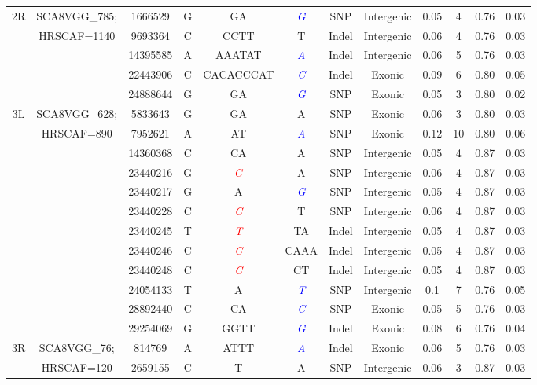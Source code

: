 \begin{table}[!b]
\begin{center}
\begin{tabular}{ccS[table-format=8.0]ccccccS[table-format=2.0]S[table-format=1.2]S[table-format=1.3]}
 \midrule
 2R & SCA8VGG\_785; & 1666529 & G & GA & \textcolor{blue}{\textit{G}} & SNP & Intergenic & 0.05 & 4 & 0.76 & 0.03\\
 & HRSCAF=1140 & 9693364 & C & CCTT & T & Indel & Intergenic & 0.06 & 4 & 0.76 & 0.03\\
 &  & 14395585 & A & AAATAT & \textcolor{blue}{\textit{A}} & Indel & Intergenic & 0.06 & 5 & 0.76 & 0.03\\
 &  & 22443906 & C & CACACCCAT & \textcolor{blue}{\textit{C}} & Indel & Exonic & 0.09 & 6 & 0.80 & 0.05\\
 &  & 24888644 & G & GA & \textcolor{blue}{\textit{G}} & SNP & Exonic & 0.05 & 3 & 0.80 & 0.02\\
 \midrule
3L & SCA8VGG\_628; & 5833643 & G & GA & A & SNP & Exonic & 0.06 & 3 & 0.80 & 0.03\\
 & HRSCAF=890 & 7952621 & A & AT & \textcolor{blue}{\textit{A}} & SNP & Exonic & 0.12 & 10 & 0.80 & 0.06\\
 &  & 14360368 & C & CA & A & SNP & Intergenic & 0.05 & 4 & 0.87 & 0.03\\
 &  & 23440216 & G & \textcolor{red}{\textit{G}} & A & SNP & Intergenic & 0.06 & 4 & 0.87 & 0.03\\
 &  & 23440217 & G & A & \textcolor{blue}{\textit{G}} & SNP & Intergenic & 0.05 & 4 & 0.87 & 0.03\\
 &  & 23440228 & C &\textcolor{red}{\textit{C}} & T & SNP & Intergenic & 0.06 & 4 & 0.87 & 0.03\\
 &  & 23440245 & T &\textcolor{red}{\textit{T}} & TA & Indel & Intergenic & 0.05 & 4 & 0.87 & 0.03\\
 &  & 23440246 & C &\textcolor{red}{\textit{C}} & CAAA & Indel & Intergenic & 0.05 & 4 & 0.87 & 0.03\\
 &  & 23440248 & C &\textcolor{red}{\textit{C}} & CT & Indel & Intergenic & 0.05 & 4 & 0.87 & 0.03\\
 &  & 24054133 & T & A & \textcolor{blue}{\textit{T}} & SNP & Intergenic & 0.1 & 7 & 0.76 & 0.05\\
 &  & 28892440 & C & CA & \textcolor{blue}{\textit{C}} & SNP & Exonic & 0.05 & 5 & 0.76 & 0.03\\
 &  & 29254069 & G & GGTT & \textcolor{blue}{\textit{G}} & Indel & Exonic & 0.08 & 6 & 0.76 & 0.04\\
 \midrule
 3R & SCA8VGG\_76; & 814769 & A & ATTT & \textcolor{blue}{\textit{A}} & Indel & Exonic & 0.06 & 5 & 0.76 & 0.03\\
 & HRSCAF=120 & 2659155 & C & T & A & SNP & Intergenic & 0.06 & 3 & 0.87 & 0.03\\

\end{tabular}
\end{center}
\end{table}
